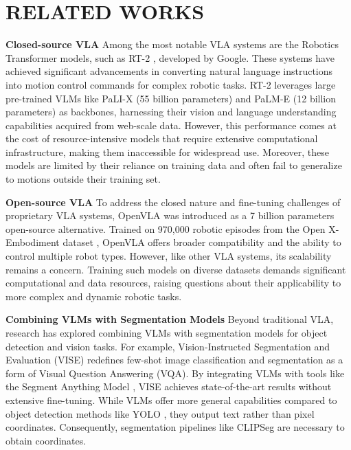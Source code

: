\section{RELATED WORKS}
\textbf{Closed-source VLA} Among the most notable VLA systems are the Robotics Transformer models, such as RT-2 \cite{rt2}, developed by Google. These systems have achieved significant advancements in converting natural language instructions into motion control commands for complex robotic tasks. RT-2 leverages large pre-trained VLMs like PaLI-X \cite{palix} (55 billion parameters) and PaLM-E \cite{palmee} (12 billion parameters) as backbones, harnessing their vision and language understanding capabilities acquired from web-scale data. However, this performance comes at the cost of resource-intensive models that require extensive computational infrastructure, making them inaccessible for widespread use. Moreover, these models are limited by their reliance on training data and often fail to generalize to motions outside their training set.

\textbf{Open-source VLA} To address the closed nature and fine-tuning challenges of proprietary VLA systems, OpenVLA \cite{openvla} was introduced as a 7 billion parameters open-source alternative. Trained on 970,000 robotic episodes from the Open X-Embodiment dataset \cite{rt2x}, OpenVLA offers broader compatibility and the ability to control multiple robot types. However, like other VLA systems, its scalability remains a concern. Training such models on diverse datasets demands significant computational and data resources, raising questions about their applicability to more complex and dynamic robotic tasks.

\textbf{Combining VLMs with Segmentation Models} Beyond traditional VLA, research has explored combining VLMs with segmentation models for object detection and vision tasks. For example, Vision-Instructed Segmentation and Evaluation (VISE) \cite{fewshotvqa} redefines few-shot image classification and segmentation as a form of Visual Question Answering (VQA). By integrating VLMs with tools like the Segment Anything Model \cite{SegmentA}, VISE achieves state-of-the-art results without extensive fine-tuning. While VLMs offer more general capabilities compared to object detection methods like YOLO \cite{yolo}, they output text rather than pixel coordinates. Consequently, segmentation pipelines like CLIPSeg \cite{CLIPSeg} are necessary to obtain coordinates.

